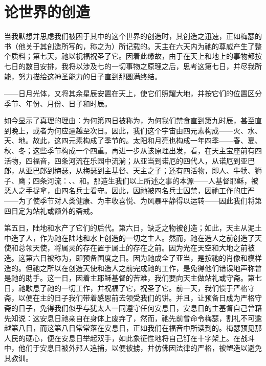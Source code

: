 
\chapter{论世界的创造}


当我默想并思虑我们被困于其中的这个世界的创造时，其创造之迅速，正如梅瑟的书（他关于其创造所写的，称之为）所记载的。天主在六天内为祂的尊威产生了整个质料；第七天，祂以祝福祝圣了它。因着此缘故，由于在天上和地上的事物都按七日的数目安排，我将以涉及七的一切事物之原理之后，思考这第七日，并尽我所能，努力描绘这神圣能力的日子直到那圆满终结。\par

——日月光体，又将其余星辰安置在天上，使它们照耀大地，并按它们的位置区分季节、年份、月份、日子和时辰。\par

如今显示了真理的理由：为何第四日被称为，为何我们禁食直到第九时辰，甚至直到晚上，或者为何应逾越至次日。因此，我们这个宇宙由四元素构成——火、水、天、地。故此，这四元素构成了季节的。太阳和月亮也构成一年四季——春、夏、秋、冬；这些季节构成一个四重。再进一步从该原理出发，看，在天主宝座前有四活物，四福音，四条河流在乐园中流淌；从亚当到诺厄的四代人，从诺厄到亚巴郎，从亚巴郎到梅瑟，从梅瑟到主基督、天主之子；还有四活物，即人、牛犊、狮子、鹰；四条河流：、、和。那造生我们以上所述之事的本源——人基督耶稣，被恶人之手捉拿，由四名兵士看守。因此，因祂被四名兵士囚禁，因祂工作的庄严——为了使季节对人类健康、为丰收喜悦、为风暴平静得以运转——因此我们将第四日定为站礼或额外的斋戒。\par

第五日，陆地和水产了它们的后代。第六日，缺乏之物被创造；如此，天主从泥土中造了人，作为祂在陆地和水上创造的一切之主人。然而，祂在造人之前创造了天使和总领天使，将属灵的存在置于属土的存在之前。因为光在天空和大地之前被造。这第六日被称为，即预备国度之日。因为祂成全了亚当，是按祂的肖像和模样造的。但祂之所以在创造天使和造人之前完成祂的工作，是免得他们错误地声称曾是祂的助手。这一日，因着主耶稣基督的苦难，我们要向天主做站礼或守斋。第七日，祂歇息了祂的一切工作，并祝福了它，祝圣了它。前一天，我们惯于严格守斋，以便在主的日子我们带着感恩前去领受我们的饼。并且，让预备日成为严格守斋的日子，免得我们似乎与犹太人一同遵守任何安息日，安息日的主基督自己曾藉先知说：这安息日祂亲自在身体上废弃了，然而，祂先前曾命令梅瑟，割礼不可逾越第八日，而这第八日常常落在安息日，正如我们在福音中所读到的。梅瑟预见那人民的硬心，便在安息日举起双手，如此象征性地将自己钉在十字架上。在战斗中，他们于安息日被外邦人追捕，以便被掳，并仿佛因法律的严格，被塑造以避免其教训。\par


